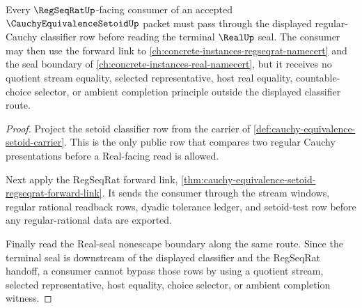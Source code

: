 \begin{theorem}
\label{thm:cauchy-equivalence-setoid-regseqrat-forward-orphan-repair}
Every $\RegSeqRatUp$-facing consumer of an accepted $\CauchyEquivalenceSetoidUp$ packet must pass through the displayed regular-Cauchy classifier row before reading the terminal $\RealUp$ seal. The consumer may then use the forward link to \autoref{ch:concrete-instances-regseqrat-namecert} and the seal boundary of \autoref{ch:concrete-instances-real-namecert}, but it receives no quotient stream equality, selected representative, host real equality, countable-choice selector, or ambient completion principle outside the displayed classifier route.
\end{theorem}
\begin{proof}
Project the setoid classifier row from the carrier of \autoref{def:cauchy-equivalence-setoid-carrier}. This is the only public row that compares two regular Cauchy presentations before a Real-facing read is allowed.

Next apply the RegSeqRat forward link, \autoref{thm:cauchy-equivalence-setoid-regseqrat-forward-link}. It sends the consumer through the stream windows, regular rational readback rows, dyadic tolerance ledger, and setoid-test row before any regular-rational data are exported.

Finally read the Real-seal nonescape boundary along the same route. Since the terminal seal is downstream of the displayed classifier and the RegSeqRat handoff, a consumer cannot bypass those rows by using a quotient stream, selected representative, host equality, choice selector, or ambient completion witness.
\end{proof}
